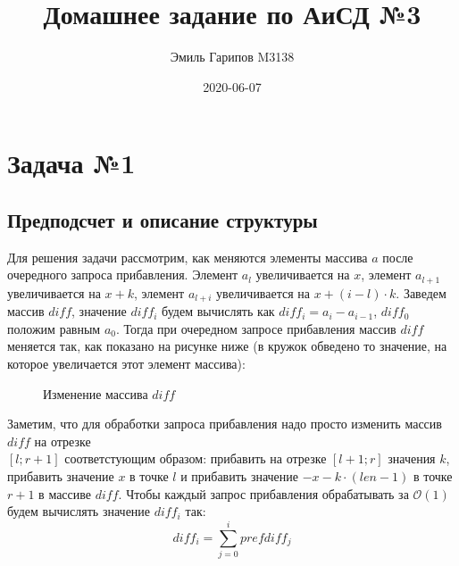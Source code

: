 \documentclass{article}
\title{Домашнее задание по АиСД №3}
\date{2020-06-07}
\author{Эмиль Гарипов M3138}
\begin{document}
\newcommand{\RomanNumeralCaps}[1]
{\MakeUppercase{\romannumeral #1}}


\maketitle
\newpage
{}

\section*{Задача №1}
\subsection*{Предподсчет и описание структуры}	
\qquad
Для решения задачи рассмотрим, как меняются элементы массива $a$ после очередного запроса прибавления. Элемент $a_l$ увеличивается на $x$, элемент $a_{l + 1}$ увеличивается на $x + k$, элемент $a_{l + i}$ увеличивается на $x + (i - l) \cdot k$. Заведем массив $diff$, значение $diff_i$ будем вычислять как $diff_i = a_i - a_{i - 1}$, $diff_0$ положим равным $a_0$. Тогда при очередном запросе прибавления массив $diff$ меняется так, как показано на рисунке ниже (в кружок обведено то значение, на которое увеличается этот элемент массива): 
\begin{figure}[h]
	\caption{Изменение массива $diff$}
	\label{fig:diff}
\end{figure}

\qquad
Заметим, что для обработки запроса прибавления надо просто изменить массив $diff$ на отрезке \\ $[l; r + 1]$ соответстующим образом: прибавить на отрезке $[l + 1; r]$ значения $k$, прибавить значение $x$ в точке $l$ и прибавить значение $-x - k \cdot (len - 1)$ в точке $r + 1$ в массиве $diff$. Чтобы каждый запрос прибавления обрабатывать за $\mathcal{O}(1)$ будем вычислять значение $diff_i$ так: 
\begin{equation}
diff_i = \sum_{j = 0}^{i}prefdiff_j
\end{equation}
\end{document}
